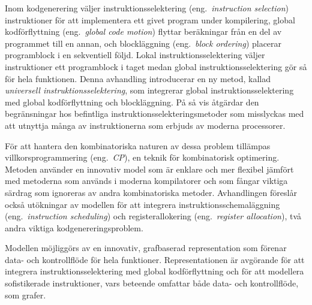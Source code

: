 %

\begin{sammanfattning}
  Inom kodgenerering v\"aljer instruktionsselektering
  (eng.\ \emph{\gls{instruction selection}}) instruktioner f\"or att
  implementera ett givet program under kompilering, global kodf\"orflyttning
  (eng.\ \emph{\gls{global code motion}}) flyttar ber\"akningar fr\r{a}n en del
  av programmet till en annan, och blockl\"aggning (eng.\ \emph{\gls{block
      ordering}}) placerar programblock i en sekventiell f\"oljd.
  Lokal instruktionsselektering v\"aljer instruktioner ett programblock i taget
  medan global instruktionsselektering g\"or s\r{a} f\"or hela funktionen.
  Denna avhandling introducerar en ny metod, kallad \emph{universell
    instruktionsselektering}, som integrerar global instruktionsselektering med
  global kodf\"orflyttning och blockl\"aggning.
  P\r{a} s\r{a} vis \r{a}tg\"ardar den begr\"ansningar hos befintliga
  instruktionsselekteringsmetoder som misslyckas med att utnyttja m\r{a}nga av
  instruktionerna som erbjuds av moderna processorer.

  F\"or att hantera den kombinatoriska naturen av dessa problem till\"ampas
  villkorsprogrammering (eng.\ \emph{\glsdesc{CP}}), en teknik f\"or
  kombinatorisk optimering.
  Metoden anv\"ander en innovativ model som \"ar enklare och mer flexibel
  j\"amf\"ort med metoderna som anv\"ands i moderna kompilatorer och som
  f\r{a}ngar viktiga s\"ardrag som ignoreras av andra kombinatoriska metoder.
  Avhandlingen f\"oresl\r{a}r ocks\r{a} ut\"okningar av modellen f\"or att
  integrera instruktionsschemal\"aggning (eng.\ \emph{\gls{instruction
      scheduling}}) och registerallokering (eng.\ \emph{\gls{register
      allocation}}), tv\r{a} andra viktiga kodgenereringsproblem.

  Modellen m\"ojligg\"ors av en innovativ, grafbaserad representation som
  f\"orenar data- och kontrollfl\"ode f\"or hela funktioner.
  Representationen \"ar avg\"orande f\"or att integrera instruktionsselektering
  med global kodf\"orflyttning och f\"or att modellera sofistikerade
  instruktioner, vars beteende omfattar b\r{a}de data- och kontrollfl\"ode, som
  grafer.


\end{sammanfattning}
